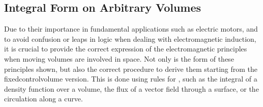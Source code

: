 \documentclass[letterpaper,10pt,italian]{jupyterBook}
\begin{document}
\subsection{Integral Form on Arbitrary Volumes}
\label{\detokenize{ch/principles:integral-form-on-arbitrary-volumes}}\label{\detokenize{ch/principles:classical-electromagnetism-principles-integral-arbitrary-volume}}
\sphinxAtStartPar
Due to their importance in fundamental applications such as electric motors, and to avoid confusion or leaps in logic when dealing with electromagnetic induction, it is crucial to provide the correct expression of the electromagnetic principles when moving volumes are involved in space. Not only is the form of these principles shown, but also the correct procedure to derive them starting from the fixed\sphinxhyphen{}control\sphinxhyphen{}volume version. This is done using rules for , such as the integral of a density function over a volume, the flux of a vector field through a surface, or the circulation along a curve.
\end{document}
